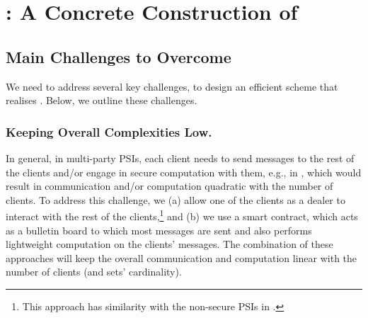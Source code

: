 %  
 
 

 

  

  




\section{\withFai: A Concrete Construction of \p}

\subsection{Main Challenges to Overcome}

 We need to address several key challenges, to design an efficient scheme that realises \p. Below, we outline these challenges.
 
 
 \subsubsection{Keeping Overall Complexities Low.}
 
 In general, in multi-party PSIs, each client needs to send messages to the rest of the clients and/or engage in secure computation with them, e.g., in \cite{DBLP:conf/scn/InbarOP18,DBLP:conf/ccs/KolesnikovMPRT17}, which would result in communication and/or computation quadratic with the number of clients. To address this challenge, we  (a) allow one of the clients as a dealer to interact with the rest of the clients,\footnote{This approach has similarity with the non-secure PSIs in \cite{GhoshN19}.} and   (b) we use a smart contract, which acts as a bulletin board to which most messages are sent and also performs lightweight computation on the clients' messages. The combination of these approaches will keep the overall communication and computation linear with the number of clients (and sets' cardinality). 
 
